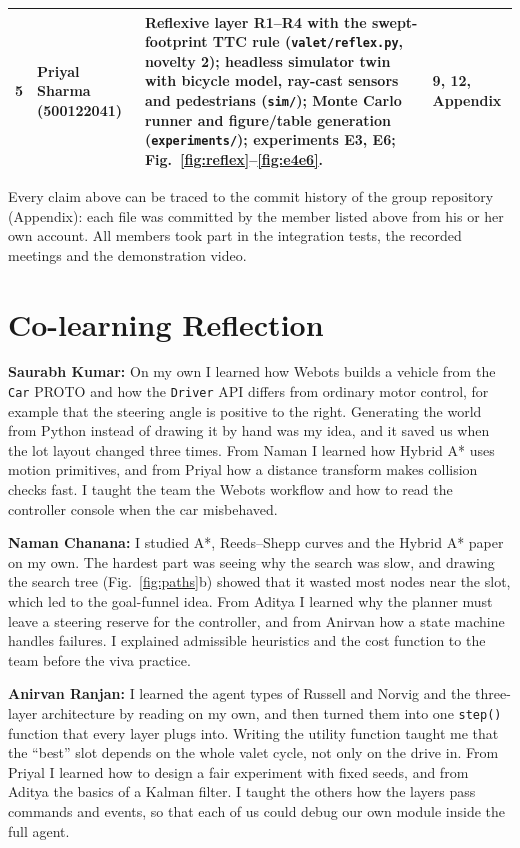 \documentclass[12pt,a4paper]{article}
\newcommand{\member}[1]{\textbf{#1}}
\begin{document}
{\begin{longtable}{|c|P{2.9cm}|P{8.0cm}|P{1.7cm}|}
5 & Priyal Sharma (500122041) & Reflexive layer R1--R4 with the swept-footprint TTC rule (\texttt{valet/reflex.py}, novelty 2); headless simulator twin with bicycle model, ray-cast sensors and pedestrians (\texttt{sim/}); Monte Carlo runner and figure/table generation (\texttt{experiments/}); experiments E3, E6; Fig.~\ref{fig:reflex}--\ref{fig:e4e6}. & 9, 12, Appendix \newline\newline \\ \hline
\end{longtable}}
\renewcommand{\arraystretch}{1.2}

Every claim above can be traced to the commit history of the group repository (Appendix): each file was committed by the member listed above from his or her own account. All members took part in the integration tests, the recorded meetings and the demonstration video.

\section{Co-learning Reflection}
\member{Saurabh Kumar:} On my own I learned how Webots builds a vehicle from the \texttt{Car} PROTO and how the \texttt{Driver} API differs from ordinary motor control, for example that the steering angle is positive to the right. Generating the world from Python instead of drawing it by hand was my idea, and it saved us when the lot layout changed three times. From Naman I learned how Hybrid A* uses motion primitives, and from Priyal how a distance transform makes collision checks fast. I taught the team the Webots workflow and how to read the controller console when the car misbehaved.

\member{Naman Chanana:} I studied A*, Reeds--Shepp curves and the Hybrid A* paper on my own. The hardest part was seeing why the search was slow, and drawing the search tree (Fig.~\ref{fig:paths}b) showed that it wasted most nodes near the slot, which led to the goal-funnel idea. From Aditya I learned why the planner must leave a steering reserve for the controller, and from Anirvan how a state machine handles failures. I explained admissible heuristics and the cost function to the team before the viva practice.

\member{Anirvan Ranjan:} I learned the agent types of Russell and Norvig and the three-layer architecture by reading on my own, and then turned them into one \texttt{step()} function that every layer plugs into. Writing the utility function taught me that the ``best'' slot depends on the whole valet cycle, not only on the drive in. From Priyal I learned how to design a fair experiment with fixed seeds, and from Aditya the basics of a Kalman filter. I taught the others how the layers pass commands and events, so that each of us could debug our own module inside the full agent.
\end{document}
